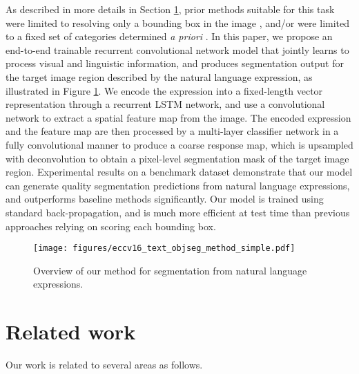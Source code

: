 \documentclass[runningheads]{llncs}
\begin{document}
As described in more details in Section \ref{sec:related_work}, prior methods suitable for this task were limited to resolving only a bounding box in the image \cite{hu2015natural,rohrbach2015grounding,mao2015generation}, and/or were limited to a fixed set of categories determined {\em a priori} \cite{long2015fully,chen2014semantic,zheng2015conditional,yu2015multi}. In this paper, we propose an end-to-end trainable recurrent convolutional network model that jointly learns to process visual and linguistic information, and produces segmentation output for the target image region described by the natural language expression, as illustrated in Figure \ref{fig:method_simple}.
We encode the expression into a fixed-length vector representation through a recurrent LSTM network, and use a convolutional network to extract a spatial feature map from the image. The encoded expression and the feature map are then processed by a multi-layer classifier network in a fully convolutional manner to produce a coarse response map, which is upsampled with deconvolution \cite{long2015fully,noh2015learning} to obtain a pixel-level segmentation mask of the target image region.
Experimental results on a benchmark dataset demonstrate that our model can generate quality segmentation predictions from natural language expressions, and outperforms baseline methods significantly. Our model is trained using standard back-propagation, and is much more efficient at test time than previous approaches relying on scoring each bounding box.

\begin{figure}[t]
\centering
\texttt{[image: figures/eccv16\_text\_objseg\_method\_simple.pdf]}
\caption{Overview of our method for segmentation from natural language expressions.}
\label{fig:method_simple}
\end{figure}

\section{Related work}\label{sec:related_work}

Our work is related to several areas as follows.
\end{document}
